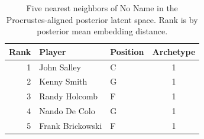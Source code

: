 \begin{table}[htbp]
  \centering\small
  \begin{tabular}{rllc}
    \toprule
    Rank & Player & Position & Archetype \\
    \midrule
    1 & John Salley & C & 1 \\
    2 & Kenny Smith & G & 1 \\
    3 & Randy Holcomb & F & 1 \\
    4 & Nando De Colo & G & 1 \\
    5 & Frank Brickowski & F & 1 \\
    \bottomrule
  \end{tabular}
  \caption{Five nearest neighbors of No Name in the Procrustes-aligned posterior latent space. Rank is by posterior mean embedding distance.}
  \label{tab:No_Name_neighbors}
\end{table}

